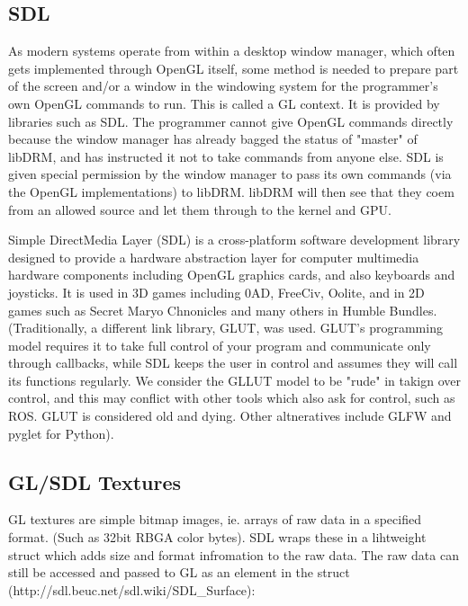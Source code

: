 \documentclass[oneside,english]{scrbook}
\begin{document}
\subsection{SDL}

As modern systems operate from within a desktop window manager, which often gets implemented through OpenGL itself, some method is needed to prepare part of the screen and/or a window in the windowing system for the programmer's own OpenGL commands to run.  This is called a GL context.  It is provided by libraries such as SDL.   The programmer cannot give OpenGL commands directly because the window manager has already bagged the status of "master" of libDRM, and has instructed it not to take commands from anyone else.  SDL is given special permission by the window manager to pass its own commands (via the OpenGL implementations) to libDRM.  libDRM will then see that they coem from an allowed source and let them through to the kernel and GPU.

Simple DirectMedia Layer (SDL) is a cross-platform software development library designed to provide a hardware abstraction layer for computer multimedia hardware components including OpenGL graphics cards, and also keyboards and joysticks.  It is used in 3D games including 0AD, FreeCiv, Oolite, and in 2D games such as Secret Maryo Chnonicles and many others in Humble Bundles.  (Traditionally, a different link library, GLUT, was used. GLUT's programming model requires it to take full control of your program and communicate only through callbacks, while SDL keeps the user in control and assumes they will call its functions regularly. We consider the GLLUT model to be "rude" in takign over control, and this may conflict with other tools which also ask for control, such as ROS.  GLUT is considered old and dying.  Other altneratives include GLFW and pyglet for Python).




\subsection{GL/SDL Textures}

GL textures are simple bitmap images, ie. arrays of raw data in a specified format. (Such as 32bit RBGA color bytes).  SDL wraps these in a lihtweight struct which adds size and format infromation to the raw data. The raw data can still be accessed and passed to GL as an element in the struct (http://sdl.beuc.net/sdl.wiki/SDL_Surface):
\end{document}
